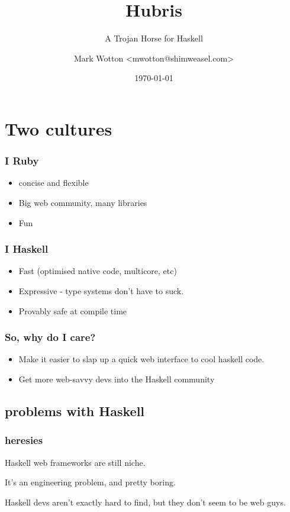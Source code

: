 \documentclass{beamer}
\title{Hubris}
\subtitle{A Trojan Horse for Haskell}
\author{Mark Wotton \textless mwotton@shimweasel.com\textgreater}
\date{\today}
\begin{document}
\lstset{language=Haskell}
\section{Two cultures}
\frame{\titlepage}

\begin{frame}
  \frametitle{I  Ruby}
  \begin{itemize}
  \item concise and flexible
  \item Big web community, many libraries
  \item Fun
  \end{itemize}
\end{frame}

\begin{frame}
  \frametitle{I  Haskell}
  \begin{itemize}
  \item<1-> Fast (optimised native code, multicore, etc)
  \item<2-> Expressive - type systems don't have to suck.
  \item<3-> Provably safe at compile time
  \end{itemize}
\end{frame}


\begin{frame}
  \frametitle{So, why do I care?}
  \begin{itemize}
  \item<1-> Make it easier to slap up a quick web interface to cool
    haskell code.
  \item<2-> Get more web-savvy devs into the Haskell community
  \end{itemize}
\end{frame}

\subsection{problems with Haskell}
\begin{frame}
\frametitle{heresies}
\setlength\parskip{0.1in}

Haskell web frameworks are still niche.

It's an engineering problem, and pretty boring.

Haskell devs aren't exactly hard to find, but they don't seem to be
web guys.

\end{frame}
\end{document}
